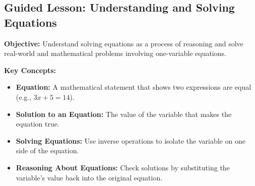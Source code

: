 \documentclass[12pt]{article}
\title{}
\date{}
\begin{document}
\subsection*{Guided Lesson: Understanding and Solving Equations}
\onehalfspacing

\begin{tcolorbox}[colframe=black!40, colback=gray!5, 
coltitle=black, colbacktitle=black!20, fonttitle=\bfseries\Large, 
title=Learning Objective, halign title=center, left=5pt, right=5pt, top=5pt, bottom=15pt]
\textbf{Objective:} Understand solving equations as a process of reasoning and solve real-world and mathematical problems involving one-variable equations.
\end{tcolorbox}

\begin{tcolorbox}[colframe=black!60, colback=white, 
coltitle=black, colbacktitle=black!15, fonttitle=\bfseries\Large, 
title=Key Concepts and Vocabulary, halign title=center, left=10pt, right=10pt, top=10pt, bottom=15pt]
\textbf{Key Concepts:}
\begin{itemize}
    \item \textbf{Equation:} A mathematical statement that shows two expressions are equal (e.g., \( 3x + 5 = 14 \)).
    \item \textbf{Solution to an Equation:} The value of the variable that makes the equation true.
    \item \textbf{Solving Equations:} Use inverse operations to isolate the variable on one side of the equation.
    \item \textbf{Reasoning About Equations:} Check solutions by substituting the variable's value back into the original equation.
\end{itemize}
\end{tcolorbox}
\end{document}

